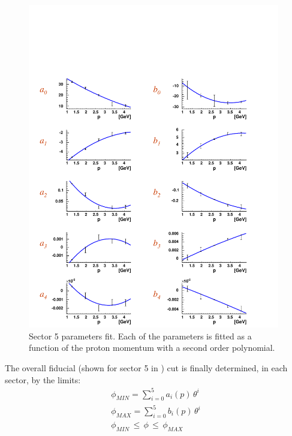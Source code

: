 \begin{figure}[h]
 \begin{center}
 \leavevmode
 \includegraphics[width = 11cm]{data_reduction/img/fid_parameters_fit}   
  \caption[\boldmath Sector 5 parameters fit]
          { Sector 5 parameters fit. Each of the parameters is fitted as a function
	             of the proton momentum with a second order polynomial.}
 \label{fig:fid_parameters_fit}
 \end{center}
\end{figure}

\cia
The overall fiducial (shown for sector 5 in ) cut is finally determined, in each sector, by the limits:
$$
\begin{array}{c}
 \phi_{MIN} = \displaystyle\sum_{i=0}^5 a_i(p)\,\theta^i \\
 \phi_{MAX} = \displaystyle\sum_{i=0}^5 b_i(p)\,\theta^i \\

 \phi_{MIN} \,\le\, \phi \,\le\, \phi_{MAX} \\
\end{array}
$$

